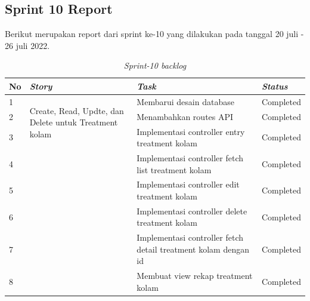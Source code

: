 
\subsection{Sprint 10 Report}
Berikut merupakan report dari sprint ke-10 yang dilakukan pada tanggal 20 juli - 26 juli 2022.

\begin{table}[H]
	\caption{\textit{Sprint-10 backlog}}
	\label{sprint10_backlog}
	\begin{tabular}{@{} |p{0.5cm}|p{5cm}|p{5cm}|p{2cm}| @{}}
		\hline
		\textbf{No} & \textbf{\textit{Story}} & \textbf{\textit{Task}} & \textbf{\textit{Status}} \\
		\hline
		1 & \multirow{3}{5cm}{Create, Read, Updte, dan Delete untuk Treatment kolam} & Membarui desain database  & Completed\\
		\cline{1-1}\cline{3-4}
		2 & & Menambahkan routes API & Completed\\
		\cline{1-1}\cline{3-4}
		3 & & Implementasi controller entry treatment kolam & Completed\\
		\cline{1-1}\cline{3-4}
		4 & & Implementasi controller fetch list treatment kolam & Completed\\
		\cline{1-1}\cline{3-4}
		5 & & Implementasi controller edit treatment kolam & Completed\\
		\cline{1-1}\cline{3-4}
		6 & & Implementasi controller delete treatment kolam & Completed\\
		\cline{1-1}\cline{3-4}
		7 & & Implementasi controller fetch detail treatment kolam dengan id& Completed\\
		\cline{1-1}\cline{3-4}
		8 & & Membuat view rekap treatment kolam & Completed\\
		\cline{1-1}\cline{3-4}
		\hline
	\end{tabular}
\end{table}

